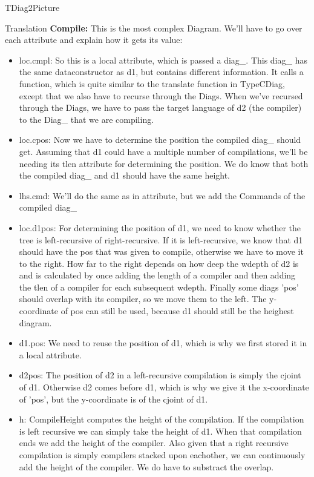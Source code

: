 \documentclass{article}
\begin{document}
\begin{subsection}{TDiag2Picture}
\begin{subsubsection}{Translation}
\textbf{Compile:} This is the most complex Diagram. We'll have to go over each attribute and explain how it gets its value:
	\begin{itemize}
	\item loc.cmpl: So this is a local attribute, which is passed a diag\_. This diag\_ has the same dataconstructor as d1, but contains different information. It calls a function, which is quite similar to the translate function in TypeCDiag, except that we also have to recurse through the Diags. When we've recursed through the Diags, we have to pass the target language of d2 (the compiler) to the Diag\_ that we are compiling. 
	\item loc.cpos: Now we have to determine the position the compiled diag\_ should get. Assuming that d1 could have a multiple number of compilations, we'll be needing its tlen attribute for determining the position. We do know that both the compiled diag\_ and d1 should have the same height.
	\item lhs.cmd: We'll do the same as in attribute, but we add the Commands of the compiled diag\_
	\item loc.d1pos: For determining the position of d1, we need to know whether the tree is left-recursive of right-recursive. If it is left-recursive, we know that d1 should have the pos that was given to compile, otherwise we have to move it to the right. How far to the right depends on how deep the wdepth of d2 is and is calculated by once adding the length of a compiler and then adding the tlen of a compiler for each subsequent wdepth. Finally some diags 'pos' should overlap with its compiler, so we move them to the left. The y-coordinate of pos can still be used, because d1 should still be the heighest diagram. 
	\item d1.pos: We need to reuse the position of d1, which is why we first stored it in a local attribute.
	\item d2pos: The position of d2 in a left-recursive compilation is simply the cjoint of d1. Otherwise d2 comes before d1, which is why we give it the x-coordinate of 'pos', but the y-coordinate is of the cjoint of d1.
	\item h: CompileHeight computes the height of the compilation. If the compilation is left recursive we can simply take the height of d1. When that compilation ends we add the height of the compiler. Also given that a right recursive compilation is simply compilers stacked upon eachother, we can continuously add the height of the compiler. We do have to substract the overlap.

\end{itemize}
\end{subsubsection}
\end{subsection}
\end{document}
